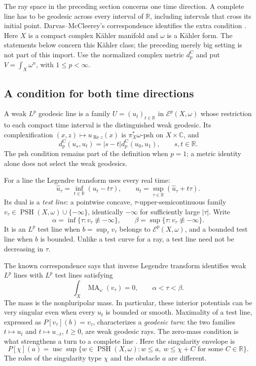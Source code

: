 The ray space in the preceding section concerns one time direction.
A complete line has to be geodesic across every interval of
$\mathbb R$, including intervals that cross its initial point.
Darvas--McCleerey's correspondence identifies the extra condition
\cite[Theorems~1.1 and~4.1]{DarvasMcCleerey26Lines}.
Here $X$ is a compact complex K\"ahler manifold and $\omega$ is a
K\"ahler form. The statements below concern this K\"ahler class;
the preceding merely big setting is not part of this import.
Use the normalized complex metric $d_p^{\mathrm C}$ and put
$V=\int_X\omega^n$, with $1\leq p<\infty$.

\subsection{A condition for both time directions}

A weak $L^p$ geodesic line is a family $U=(u_t)_{t\in\mathbb R}$
in $\mathcal E^p(X,\omega)$ whose restriction to each compact
time interval is the distinguished weak geodesic. Its
complexification $(x,z)\mapsto u_{\operatorname{Re}z}(x)$ is
$\pi_X^*\omega$-psh on $X\times\mathbb C$, and
\[
 d_p^{\mathrm C}(u_s,u_t)
 =|s-t|d_p^{\mathrm C}(u_0,u_1),\qquad s,t\in\mathbb R.
\]
The psh condition remains part of the definition when $p=1$;
a metric identity alone does not select the weak geodesics.

For a line the Legendre transform uses every real time:
\[
\tag{65.49}\label{eq:rf-line-legendre}
 \widehat u_\tau=\inf_{t\in\mathbb R}(u_t-t\tau),\qquad
 u_t=\sup_{\tau\in\mathbb R}(\widehat u_\tau+t\tau).
\]
Its dual is a \emph{test line}: a pointwise concave,
$\tau$-upper-semicontinuous family
$v_\tau\in\operatorname{PSH}(X,\omega)\cup\{-\infty\}$,
identically $-\infty$ for sufficiently large $|\tau|$.
Write
\[
 \alpha=\inf\{\tau:v_\tau\not\equiv-\infty\},\qquad
 \beta=\sup\{\tau:v_\tau\not\equiv-\infty\}.
\]
It is an $L^p$ test line when $b=\sup_\tau v_\tau$ belongs
to $\mathcal E^p(X,\omega)$, and a bounded test line when
$b$ is bounded. Unlike a test curve for a ray, a test line
need not be decreasing in $\tau$.

The known correspondence says that inverse Legendre transform
identifies weak $L^p$ lines with $L^p$ test lines satisfying
\[
\tag{65.50}\label{eq:rf-line-zero-mass}
 \int_X\operatorname{MA}_\omega(v_\tau)=0,
 \qquad \alpha<\tau<\beta.
\]
The mass is the nonpluripolar mass. In particular, these
interior potentials can be very singular even when every
$u_t$ is bounded or smooth.
Maximality of a test line, expressed as
$P[v_\tau](b)=v_\tau$, characterizes a \emph{geodesic turn}:
the two families $t\mapsto u_t$ and $t\mapsto u_{-t}$,
$t\geq0$, are weak geodesic rays. The zero-mass condition
is what strengthens a turn to a complete line
\cite[Proposition~3.7; Theorem~4.1]{DarvasMcCleerey26Lines}.
Here the singularity envelope is
\[
\tag{65.51}\label{eq:rf-line-singularity-envelope}
 P[\chi](a)=\operatorname{usc}\sup\{w\in\operatorname{PSH}(X,\omega):
             w\leq a,\ w\leq\chi+C\text{ for some }C\in\mathbb R\}.
\]
The roles of the singularity type $\chi$ and the obstacle
$a$ are different.

